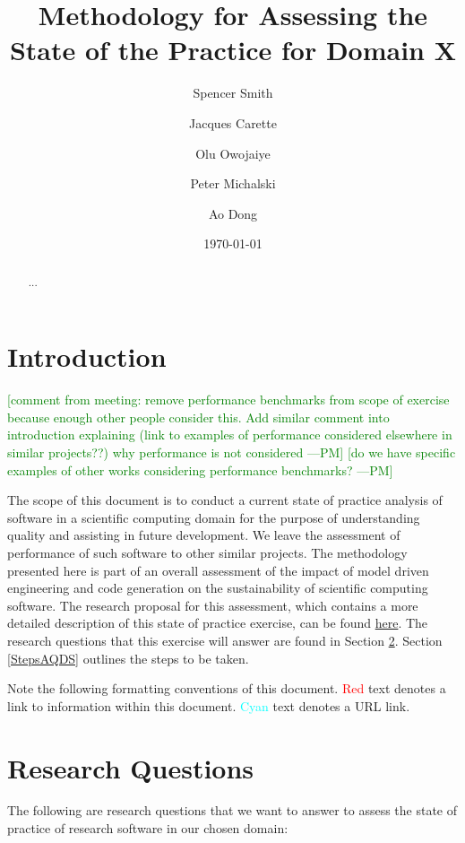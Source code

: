 \documentclass[letterpaper,cleveref]{lipics-v2019}
\title{Methodology for Assessing the State of the Practice for Domain X}
\author{Spencer Smith}{McMaster University, Canada}{smiths@mcmaster.ca}{}{}
\author{Jacques Carette}{McMaster University, Canada}{carette@mcmaster.ca}{}{}
\author{Olu Owojaiye}{McMaster University, Canada}{owojaiyo@mcmaster.ca}{}{}
\author{Peter Michalski}{McMaster University, Canada}{michap@mcmaster.ca}{}{}
\author{Ao Dong}{McMaster University, Canada}{donga9@mcmaster.ca}{}{}
\date{\today}
\newcommand{\authornote}[3]{\textcolor{#1}{[#3 ---#2]}}
\newcommand{\authornote}[3]{}
\newcommand{\pmi}[1]{\authornote{green}{PM}{#1}} %
\theoremstyle{definition}
\begin{document}
\maketitle

\begin{abstract}
	...
\end{abstract}

\tableofcontents

\section{Introduction} \label{SecIntroduction}

\pmi{comment from meeting: remove performance benchmarks from scope of exercise because enough other people consider this. Add similar comment into introduction explaining (link to examples of performance considered elsewhere in similar projects??) why performance is not considered}
\pmi{do we have specific examples of other works considering performance benchmarks?}

The scope of this document is to conduct a current state of practice analysis of software in a scientific computing domain for the purpose of understanding quality and assisting in future development. We leave the assessment of performance of such software to other similar projects. The methodology presented here is part of an overall assessment of the impact of model driven engineering and code generation on the sustainability of scientific computing software. The research proposal for this assessment, which contains a more detailed description of this state of practice exercise, can be found \href{https://github.com/smiths/AIMSS/blob/master/OverallResearchProposal/ResearchProposal.pdf}{here}. The research questions that this exercise will answer are found in Section \ref{ResearchQuestions}. Section \ref{StepsAQDS} outlines the steps to be taken. 
 
 Note the following formatting conventions of this document. \textcolor{red}{Red} text denotes a link to information within this document. \textcolor{cyan}{Cyan} text denotes a URL link.


\section{Research Questions}\label{ResearchQuestions}

The following are research questions that we want to answer to assess the state of practice of research software in our chosen domain:
\end{document}
